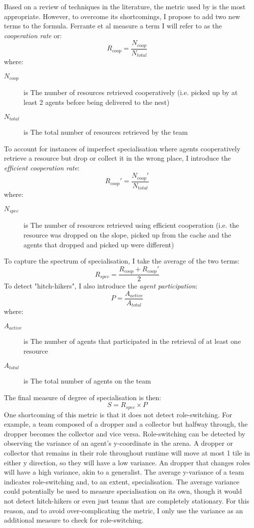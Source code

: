\documentclass[12pt]{article}
\begin{document}
Based on a review of techniques in the literature, the metric used by \cite{ferrante:PLoSCB:2015} is the most appropriate. However, to overcome its shortcomings, I propose to add two new terms to the formula. Ferrante et al measure a term I will refer to as the \textit{cooperation rate} or:\\
%
\[ 
R_{coop} = \frac{N_{coop}}{N_{total}}
\]
where:
\begin{description}
\item[$N_{coop}$] is The number of resources retrieved cooperatively (i.e. picked up by at least 2 agents before being delivered to the nest)
\item[$N_{total}$] is The total number of resources retrieved by the team
\end{description}
%
To account for instances of imperfect specialisation where agents cooperatively retrieve a resource but drop or collect it in the wrong place, I introduce the \textit{efficient cooperation rate}:
%
\[ 
R_{coop}' = \frac{N_{coop}'}{N_{total}}
\]
where:
\begin{description}
\item[$N_{spec}$] is The number of resources retrieved using efficient cooperation (i.e. the resource was dropped on the slope, picked up from the cache and the agents that dropped and picked up were different)
\end{description}
%
To capture the spectrum of specialisation, I take the average of the two terms:
%
\[ 
R_{spec} = \frac{R_{coop} + R_{coop}'}{2}
\]
%
To detect "hitch-hikers", I also introduce the \textit{agent participation}:
%
\[ 
P = \frac{A_{active}}{A_{total}}
\]
where:
\begin{description}
\item[$A_{active}$] is The number of agents that participated in the retrieval of at least one resource
\item[$A_{total}$] is The total number of agents on the team
\end{description}
%
The final measure of degree of specialisation is then:
%
\[ 
S = R_{spec} \times P
\]
%
One shortcoming of this metric is that it does not detect role-switching. For example, a team composed of a dropper and a collector but halfway through, the dropper becomes the collector and vice versa. Role-switching can be detected by observing the variance of an agent's y-coordinate in the arena. A dropper or collector that remains in their role throughout runtime will move at most 1 tile in either y direction, so they will have a low variance. An dropper that changes roles will have a high variance, akin to a generalist. The average y-variance of a team indicates role-switching and, to an extent, specialisation. The average variance could potentially be used to measure specialisation on its own, though it would not detect hitch-hikers or even just teams that are completely stationary. For this reason, and to avoid over-complicating the metric, I only use the variance as an additional measure to check for role-switching.
\end{document}
